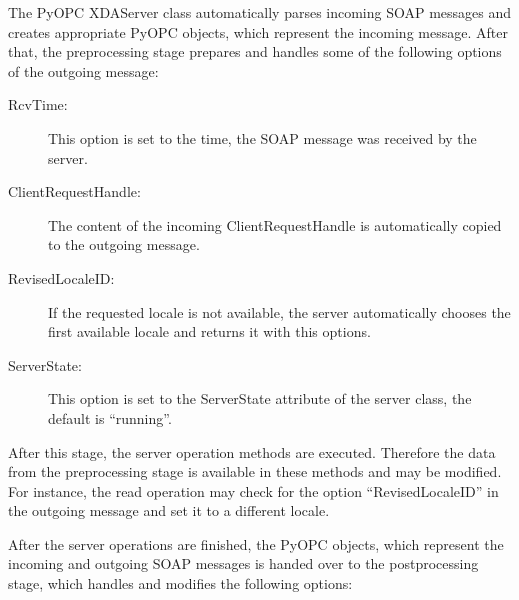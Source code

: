 The PyOPC XDAServer class automatically parses incoming SOAP messages
and creates appropriate PyOPC objects, which represent the incoming
message. After that, the preprocessing stage prepares and handles some
of the following options of the outgoing message:

\begin{description}

\item[RcvTime:] This option is set to the time, the SOAP message was
received by the server.
\item[ClientRequestHandle:] The content of the incoming
ClientRequestHandle is automatically copied to the outgoing message.
\item[RevisedLocaleID:] If the requested locale is not available, the
server automatically chooses the first available locale and returns it
with this options.
\item[ServerState:] This option is set to the ServerState attribute of
the server class, the default is ``running''.

\end{description}

After this stage, the server operation methods are executed.
Therefore the data from the preprocessing stage is available in these
methods and may be modified.  For instance, the read operation may
check for the option ``RevisedLocaleID'' in the outgoing message and
set it to a different locale.

After the server operations are finished, the PyOPC objects, which
represent the incoming and outgoing SOAP messages is handed over to
the postprocessing stage, which handles and modifies the following
options:

